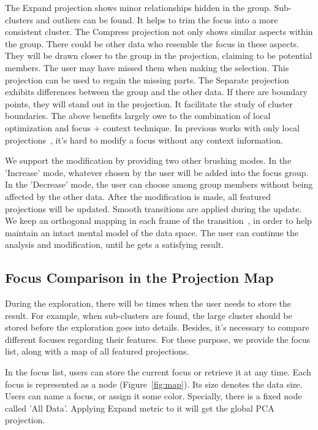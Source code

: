 The Expand projection shows minor relationships hidden in the group. Sub-clusters and outliers can be found. It helps to trim the focus into a more consistent cluster. The Compress projection not only shows similar aspects within the group. There could be other data who resemble the focus in these aspects. They will be drawn closer to the group in the projection, claiming to be potential members. The user may have missed them when making the selection. This projection can be used to regain the missing parts. The Separate projection exhibits differences between the group and the other data. If there are boundary points, they will stand out in the projection. It facilitate the study of cluster boundaries. The above benefits largely owe to the combination of local optimization and focus + context technique. In previous works with only local projections~\cite{DBLP:journals/tvcg/YuanRWG13}, it's hard to modify a focus without any context information.

We support the modification by providing two other brushing modes. In the 'Increase' mode, whatever chosen by the user will be added into the focus group. In the 'Decrease' mode, the user can choose among group members without being affected by the other data. After the modification is made, all featured projections will be updated. Smooth transitions are applied during the update. We keep an orthogonal mapping in each frame of the transition~\cite{cook2004computational}, in order to help maintain an intact mental model of the data space. The user can continue the analysis and modification, until he gets a satisfying result.

\subsection{Focus Comparison in the Projection Map}
During the exploration, there will be times when the user needs to store the result. For example, when sub-clusters are found, the large cluster should be stored before the exploration goes into details. Besides, it's necessary to compare different focuses regarding their features. For these purpose, we provide the focus list, along with a map of all featured projections.

In the focus list, users can store the current focus or retrieve it at any time. Each focus is represented as a node (Figure~\ref{fig:map}). Its size denotes the data size. Users can name a focus, or assign it some color. Specially, there is a fixed node called 'All Data'. Applying Expand metric to it will get the global PCA projection.


